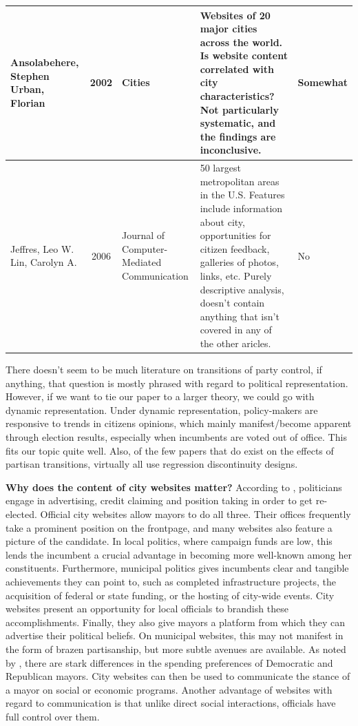 \documentclass[11pt]{article}
\begin{document}
\begin{landscape}
\begin{table}[htbp]
\begin{tabular}{|p{2cm}|c|p{3cm}|p{12cm}|l|}
			Ansolabehere, Stephen
			Urban, Florian & 2002 & Cities & Websites of 20 major cities across the world. Is website content correlated with city characteristics? Not particularly systematic, and the findings are inconclusive. & Somewhat \\ \hline
			Jeffres, Leo W.
			Lin, Carolyn A. & 2006 & Journal of Computer-Mediated Communication & 50 largest metropolitan areas in the U.S. Features include information about city, opportunities for citizen feedback, galleries of photos, links, etc.  Purely descriptive analysis, doesn't contain anything that isn't covered in any of the other aricles. & No \\ \hline
		\end{tabular}
		\label{}
	\end{table}
\end{landscape}

There doesn't seem to be much literature on transitions of party control, if anything, that question is mostly phrased with regard to political representation. However, if we want to tie our paper to a larger theory, we could go with dynamic representation. Under dynamic representation, policy-makers are responsive to trends in citizens opinions, which mainly manifest/become apparent through election results, especially when incumbents are voted out of office. This fits our topic quite well. Also, of the few papers that do exist on the effects of partisan transitions, virtually all use regression discontinuity designs.

\textbf{Why does the content of city websites matter?} According to \cite{Mayhew1974}, politicians engage in advertising, credit claiming and position taking in order to get re-elected. Official city websites allow mayors to do all three. Their offices frequently take a prominent position on the frontpage, and many websites also feature a picture of the candidate. In local politics, where campaign funds are low, this lends the incumbent a crucial advantage in becoming more well-known among her constituents. Furthermore, municipal politics gives incumbents clear and tangible achievements they can point to, such as completed infrastructure projects, the acquisition of federal or state funding, or the hosting of city-wide events. City websites present an opportunity for local officials to brandish these accomplishments. Finally, they also give mayors a platform from which they can advertise their political beliefs. On municipal websites, this may not manifest in the form of brazen partisanship, but more subtle avenues are available. As noted by \cite{Einstein2015a}, there are stark differences in the spending preferences of Democratic and Republican mayors. City websites can then be used to communicate the stance of a mayor on social or economic programs. Another advantage of websites with regard to communication is that unlike direct social interactions, officials have full control over them.
\end{document}
